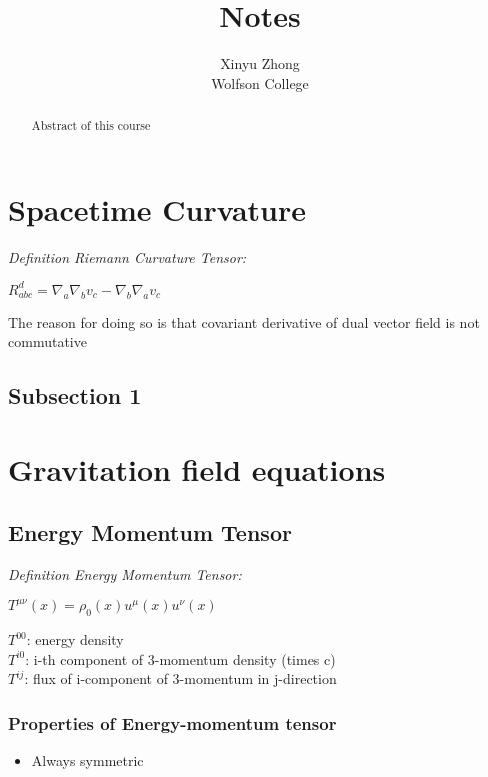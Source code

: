 \documentclass[12pt,a4paper]{article}
\author{Xinyu Zhong\\Wolfson College}
\title{Notes}
\newcommand{\definition}[3]
    {
    \textit{Definition #1: }
    \begin{center}
        {#2}
    \end{center}
    {#3}
    }
\begin{document}
\begin{titlepage}
    \maketitle
\end{titlepage}

\tableofcontents

\newpage

\begin{abstract}
\noindent
Abstract of this course
\end{abstract}


\section{Spacetime Curvature}
\definition{Riemann Curvature Tensor}
    {$R_{abc}^d=\nabla_a\nabla_b v_c-\nabla_b\nabla_a v_c$}
    {The reason for doing so is that covariant derivative of dual vector field is not commutative}
    \subsection{Subsection 1}
\section{Gravitation field equations}
    \subsection{Energy Momentum Tensor}
    \definition{Energy Momentum Tensor}
        {$T^{\mu\nu}(x)=\rho_0(x) u^\mu(x) u^\nu(x)$}
        {
        $T^{00}$: energy density\\
        $T^{i0}$: i-th component of 3-momentum density (times c)\\
        $T^{ij}$: flux of i-component of 3-momentum in j-direction
        }
    \subsubsection{Properties of Energy-momentum tensor}
    \begin{itemize}
        \item Always symmetric
    \end{itemize}
\end{document}
